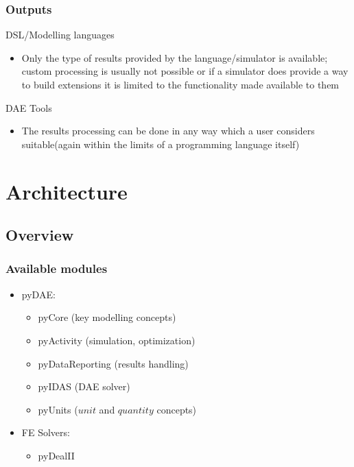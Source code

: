 \documentclass{beamer}
\begin{document}
\begin{frame}
\frametitle{Outputs}
\begin{block}{\textcolor{light_red}{DSL/Modelling languages}}
\begin{itemize}
  \item Only the type of results provided by the language/simulator is available; custom processing is usually not possible or
        if a simulator does provide a way to build extensions it is limited to the functionality made available to them 
\end{itemize}
\end{block}

\begin{block}{\textcolor{light_green}{DAE Tools}}
\begin{itemize}
  \item The results processing can be done in any way which a user considers suitable(again within the limits
        of a programming language itself) 
\end{itemize}
\end{block}
\end{frame}

\section{Architecture}

\subsection{Overview}
\begin{frame}
\frametitle{Available modules}
\begin{block}{}
\begin{itemize}
  \item pyDAE:
  \begin{itemize}
    \item pyCore (key modelling concepts)
    \item pyActivity (simulation, optimization)
    \item pyDataReporting (results handling)
    \item pyIDAS (DAE solver)
    \item pyUnits ($unit$ and $quantity$ concepts)
  \end{itemize}
\end{itemize}
\end{block}
\begin{block}{}
\begin{itemize}
  \item FE Solvers: 
  \begin{itemize}
    \item pyDealII
  \end{itemize}
\end{itemize}
\end{block}
\end{frame}
\end{document}

